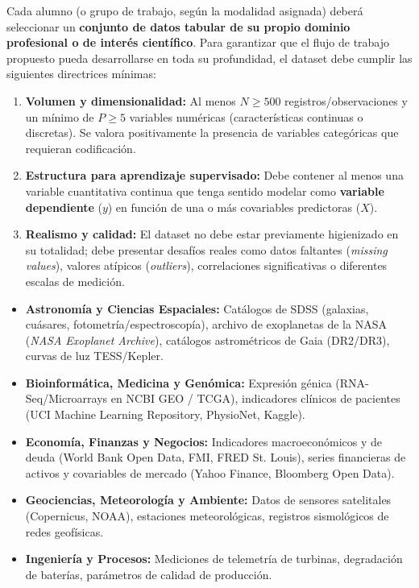 \documentclass[11pt,a4paper]{article}
\begin{document}
Cada alumno (o grupo de trabajo, según la modalidad asignada) deberá seleccionar un \textbf{conjunto de datos tabular de su propio dominio profesional o de interés científico}. Para garantizar que el flujo de trabajo propuesto pueda desarrollarse en toda su profundidad, el dataset debe cumplir las siguientes directrices mínimas:

\begin{enumerate}[leftmargin=*,itemsep=3pt]
    \item \textbf{Volumen y dimensionalidad:} Al menos $N \ge 500$ registros/observaciones y un mínimo de $P \ge 5$ variables numéricas (características continuas o discretas). Se valora positivamente la presencia de variables categóricas que requieran codificación.
    \item \textbf{Estructura para aprendizaje supervisado:} Debe contener al menos una variable cuantitativa continua que tenga sentido modelar como \textbf{variable dependiente} ($y$) en función de una o más covariables predictoras ($X$).
    \item \textbf{Realismo y calidad:} El dataset no debe estar previamente higienizado en su totalidad; debe presentar desafíos reales como datos faltantes (\textit{missing values}), valores atípicos (\textit{outliers}), correlaciones significativas o diferentes escalas de medición.
\end{enumerate}

\begin{tipbox}
\begin{itemize}[leftmargin=*,itemsep=2pt]
    \item \textbf{Astronomía y Ciencias Espaciales:} Catálogos de SDSS (galaxias, cuásares, fotometría/espectroscopía), archivo de exoplanetas de la NASA (\textit{NASA Exoplanet Archive}), catálogos astrométricos de Gaia (DR2/DR3), curvas de luz TESS/Kepler.
    \item \textbf{Bioinformática, Medicina y Genómica:} Expresión génica (RNA-Seq/Microarrays en NCBI GEO / TCGA), indicadores clínicos de pacientes (UCI Machine Learning Repository, PhysioNet, Kaggle).
    \item \textbf{Economía, Finanzas y Negocios:} Indicadores macroeconómicos y de deuda (World Bank Open Data, FMI, FRED St. Louis), series financieras de activos y covariables de mercado (Yahoo Finance, Bloomberg Open Data).
    \item \textbf{Geociencias, Meteorología y Ambiente:} Datos de sensores satelitales (Copernicus, NOAA), estaciones meteorológicas, registros sismológicos de redes geofísicas.
    \item \textbf{Ingeniería y Procesos:} Mediciones de telemetría de turbinas, degradación de baterías, parámetros de calidad de producción.
\end{itemize}
\end{tipbox}
\end{document}
